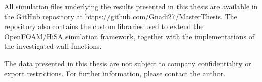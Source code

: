 \label{chap:data-avail}

All simulation files underlying the results presented in this thesis are available in the GitHub repository at \url{https://github.com/Gnadi27/MasterThesis}. The repository also contains the custom libraries used to extend the OpenFOAM/HiSA simulation framework, together with the implementations of the investigated wall functions.

The data presented in this thesis are not subject to company confidentiality or export restrictions. For further information, please contact the author.